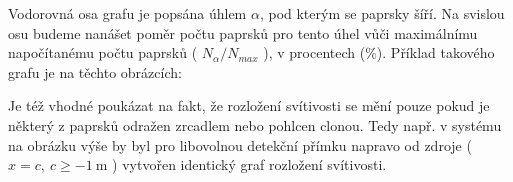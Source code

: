 Vodorovná osa grafu je popsána úhlem $\alpha$, pod kterým se paprsky šíří. Na svislou osu budeme nanášet poměr počtu paprsků pro tento úhel vůči maximálnímu napočítanému počtu paprsků ( $ N_\alpha / N_{max} $ ), v procentech ($\mathrm{\%}$). Příklad takového grafu je na těchto obrázcích:


Je též vhodné poukázat na fakt, že rozložení svítivosti se mění pouze pokud je některý z paprsků odražen zrcadlem nebo pohlcen clonou. Tedy např. v systému na obrázku výše by byl pro libovolnou detekční přímku napravo od zdroje ( $x = c,\ c \geq -1\ \mathrm{m}$ ) vytvořen identický graf rozložení svítivosti.
